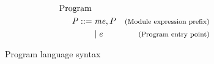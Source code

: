 \begin{figure}[!htb]
\captionsetup{skip=0pt}
\begin{align*}
\begin{aligned}
\text{Program } \\
\mathit{P} ::= \; & \mathit{me}, P & \footnotesize\text{(Module expression prefix)}\\
&|\; e & \footnotesize\text{(Program entry point)}\\
\end{aligned}
\end{align*}
\caption{Program language syntax \label{fig:ProgramSyntax}}
\label{fig:Syntax}
\end{figure}
